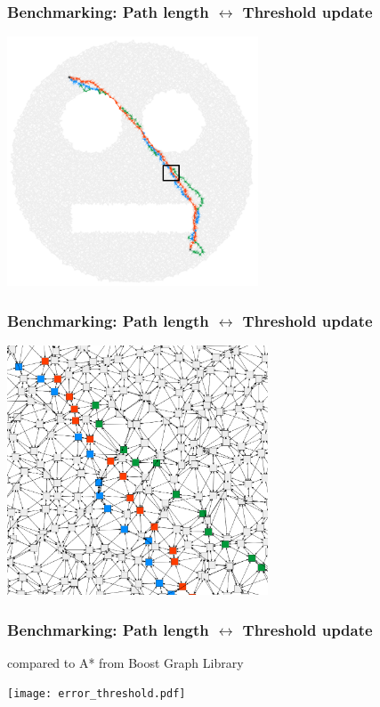 \documentclass{beamer}
\begin{document}
\begin{frame}
\frametitle{Benchmarking: Path length $\leftrightarrow$ Threshold update}
\begin{center}
	\includegraphics[height=210pt]{smileygraph_zoom.png}
\end{center}
\end{frame}

\begin{frame}
\frametitle{Benchmarking: Path length $\leftrightarrow$ Threshold update}
\begin{center}
	\includegraphics[height=210pt]{path_close.png}
\end{center}
\end{frame}


\begin{frame}
\frametitle{Benchmarking: Path length $\leftrightarrow$ Threshold update}
compared to A* from Boost Graph Library
\begin{center}
	\texttt{[image: error\_threshold.pdf]}
\end{center}
\end{frame}

\end{document}
